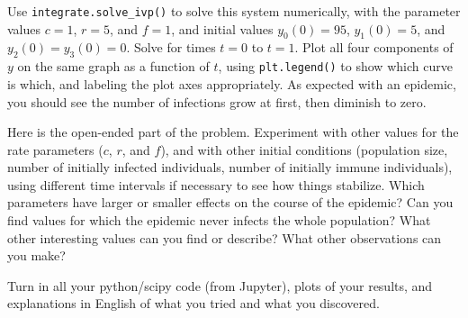 \documentclass[11pt]{article}
\begin{document}
Use {\tt integrate.solve\_ivp()} to solve this system numerically,
with the parameter values $c=1$, $r=5$, and $f=1$,
and initial values $y_0(0)=95$, $y_1(0)=5$, and $y_2(0)=y_3(0)=0$.
Solve for times $t=0$ to $t=1$.
Plot all four components of $y$ on the same graph as a function of $t$,
using {\tt plt.legend()} to show which curve is which,
and labeling the plot axes appropriately.
As expected with an epidemic, 
you should see the number of infections grow at first,
then diminish to zero.

Here is the open-ended part of the problem.
Experiment with other values for the rate parameters ($c$, $r$, and $f$),
and with other initial conditions (population size, number of initially
infected individuals, number of initially immune individuals),
using different time intervals if necessary to see how things stabilize.
Which parameters have larger or smaller effects on the course of the epidemic?
Can you find values for which the epidemic never infects the whole population?
What other interesting values can you find or describe?
What other observations can you make?

Turn in all your python/scipy code (from Jupyter), plots of your results, 
and explanations in English of what you tried and what you discovered.
\end{document}
